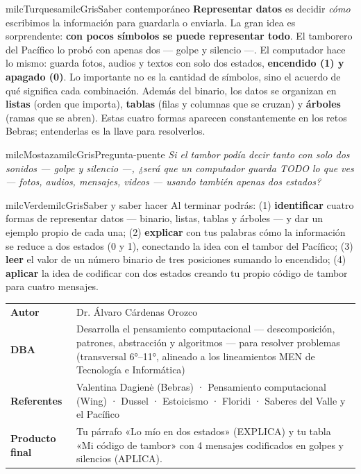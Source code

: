 \documentclass[11pt,letterpaper]{article}
\begin{document}
\begin{softbox}{milcTurquesa}{milcGris}{Saber contemporáneo}
\textbf{Representar datos} es decidir \emph{cómo} escribimos la información para guardarla o enviarla. La gran idea es sorprendente: \textbf{con pocos símbolos se puede representar todo}. El tamborero del Pacífico lo probó con apenas dos --- golpe y silencio ---. El computador hace lo mismo: guarda fotos, audios y textos con solo dos estados, \textbf{encendido (1) y apagado (0)}. Lo importante no es la cantidad de símbolos, sino el acuerdo de qué significa cada combinación. Además del binario, los datos se organizan en \textbf{listas} (orden que importa), \textbf{tablas} (filas y columnas que se cruzan) y \textbf{árboles} (ramas que se abren). Estas cuatro formas aparecen constantemente en los retos Bebras; entenderlas es la llave para resolverlos.
\end{softbox}

\begin{softbox}{milcMostaza}{milcGris}{Pregunta-puente}
\textit{Si el tambor podía decir tanto con solo dos sonidos --- golpe y silencio ---, ¿será que un computador guarda TODO lo que ves --- fotos, audios, mensajes, videos --- usando también apenas dos estados?}
\end{softbox}

\begin{softbox}{milcVerde}{milcGris}{Saber y saber hacer}
Al terminar podrás: (1) \textbf{identificar} cuatro formas de representar datos --- binario, listas, tablas y árboles --- y dar un ejemplo propio de cada una; (2) \textbf{explicar} con tus palabras cómo la información se reduce a dos estados (0 y 1), conectando la idea con el tambor del Pacífico; (3) \textbf{leer} el valor de un número binario de tres posiciones sumando lo encendido; (4) \textbf{aplicar} la idea de codificar con dos estados creando tu propio código de tambor para cuatro mensajes.
\end{softbox}



\small
\begin{tabularx}{\textwidth}{>{\bfseries}p{3.0cm}Y}
Autor & Dr. Álvaro Cárdenas Orozco\\
DBA & Desarrolla el pensamiento computacional --- descomposición, patrones, abstracción y algoritmos --- para resolver problemas (transversal 6°--11°, alineado a los lineamientos MEN de Tecnología e Informática)\\
Referentes & Valentina Dagienė (Bebras) · Pensamiento computacional (Wing) · Dussel · Estoicismo · Floridi · Saberes del Valle y el Pacífico\\
Producto final & Tu párrafo «Lo mío en dos estados» (EXPLICA) y tu tabla «Mi código de tambor» con 4 mensajes codificados en golpes y silencios (APLICA).\\
\end{tabularx}
\normalsize
\end{document}
